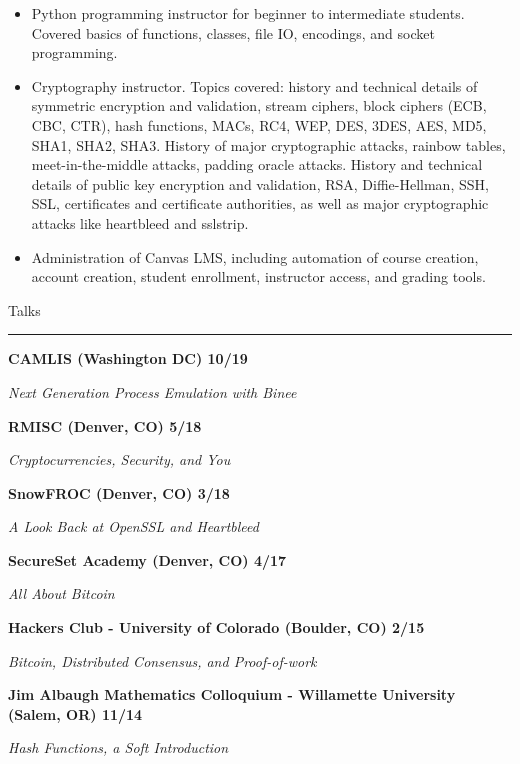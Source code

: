 \documentclass{letter}
\begin{document}
\begin{itemize}
    \setlength\itemsep{-0.5em}
    \item Python programming instructor for beginner to intermediate students. Covered basics of functions, classes, file IO, encodings, and socket programming.
    \item Cryptography instructor.  Topics covered: history and technical details of symmetric encryption and validation, stream ciphers, block ciphers (ECB, CBC, CTR), hash functions, MACs, RC4, WEP, DES, 3DES, AES, MD5, SHA1, SHA2, SHA3.  History of major cryptographic attacks, rainbow tables, meet-in-the-middle attacks, padding oracle attacks.  History and technical details of public key encryption and validation, RSA, Diffie-Hellman, SSH, SSL, certificates and certificate authorities, as well as major cryptographic attacks like heartbleed and sslstrip.
    \item Administration of Canvas LMS, including automation of course creation, account creation, student enrollment, instructor access, and grading tools.
\end{itemize}

\vspc



\large{Talks}
\vskip1mm
\hrule

\textbf{CAMLIS (Washington DC) \hfill 10/19}

\textit{Next Generation Process Emulation with Binee}

\textbf{RMISC (Denver, CO) \hfill 5/18}

\textit{Cryptocurrencies, Security, and You}

\textbf{SnowFROC (Denver, CO) \hfill 3/18}

\textit{A Look Back at OpenSSL and Heartbleed}

\textbf{SecureSet Academy (Denver, CO) \hfill 4/17}

\textit{All About Bitcoin}

\textbf{Hackers Club - University of Colorado (Boulder, CO) \hfill 2/15}

\textit{Bitcoin, Distributed Consensus, and Proof-of-work}

\textbf{Jim Albaugh Mathematics Colloquium - Willamette University (Salem, OR) \hfill 11/14}

\textit{Hash Functions, a Soft Introduction}
\end{document}
